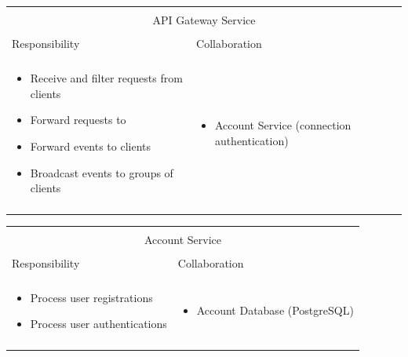\noindent
\begin{tabular}{|l|l|}
    \cline{1-2}
    \multicolumn{2}{|c|}{} \\[-0.3cm]
    \multicolumn{2}{|c|}{API Gateway Service} \\ 
    \multicolumn{2}{|c|}{} \\[-0.3cm]
    \cline{1-2}
    Responsibility & Collaboration \\
    \cline{1-2}
    & \\[-0.2cm]
    \begin{minipage}{0.47\textwidth}
        \begin{itemize}
          \item Receive and filter requests from clients
          \item Forward requests to \mss{}
          \item Forward events to clients
          \item Broadcast events to groups of clients
        \end{itemize} 
    \end{minipage}
	&
    \begin{minipage}{0.47\textwidth}
        \begin{itemize}
          \item Account Service (connection authentication)
        \end{itemize} 
    \end{minipage}
	\\ & \\
    \hline
\end{tabular}

\vspace{0.5cm} \noindent 
\begin{tabular}{|l|l|}
    \cline{1-2}
    \multicolumn{2}{|c|}{} \\[-0.3cm]
    \multicolumn{2}{|c|}{Account Service} \\ 
    \multicolumn{2}{|c|}{} \\[-0.3cm]
    \cline{1-2}
    Responsibility & Collaboration \\
    \cline{1-2}
    & \\[-0.2cm]
    \begin{minipage}{0.47\textwidth}
        \begin{itemize}
          \item Process user registrations
          \item Process user authentications
        \end{itemize} 
    \end{minipage}
	&
    \begin{minipage}{0.47\textwidth}
        \begin{itemize}
          \item Account Database (PostgreSQL)
        \end{itemize} 
    \end{minipage}
	\\ & \\
    \hline
\end{tabular}

